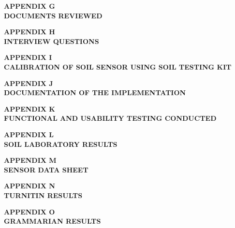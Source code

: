{	\newpage
	
	\textbf{APPENDIX G}\\[1em]
	\textbf{DOCUMENTS REVIEWED}
	
	\newpage
	
	\textbf{APPENDIX H}\\[1em]
	\textbf{INTERVIEW QUESTIONS}
	
	\newpage
	
	\textbf{APPENDIX I}\\[1em]
	\textbf{CALIBRATION OF SOIL SENSOR USING SOIL TESTING KIT}
	
	\newpage
	
	\textbf{APPENDIX J}\\[1em]
	\textbf{DOCUMENTATION OF THE IMPLEMENTATION}
	
	\newpage
	
	\textbf{APPENDIX K}\\[1em]
	\textbf{FUNCTIONAL AND USABILITY TESTING CONDUCTED}
	
	\newpage
	
	\textbf{APPENDIX L}\\[1em]
	\textbf{SOIL LABORATORY RESULTS}
	
	\newpage
	
	\textbf{APPENDIX M}\\[1em]
	\textbf{SENSOR DATA SHEET}
	
	\newpage
	
	\textbf{APPENDIX N}\\[1em]
	\textbf{TURNITIN RESULTS}
	
	\newpage
	
	\textbf{APPENDIX O}\\[1em]
	\textbf{GRAMMARIAN RESULTS}
	
}
